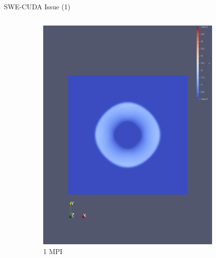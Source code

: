 \documentclass[
  english,            %
  aspectratio=169,    %
  11pt
]{tumbeamer}
\begin{document}
\begin{frame}{SWE-CUDA Issue (1)}
\begin{columns}
\begin{column}{0.45\textwidth}
	\begin{figure}[htpb]
		\centering
		\begin{subfigure}{.49\textwidth}
			\includegraphics[width=\textwidth,keepaspectratio=true]{figs/1_validation_cuda_original_1mpi.png}
			\caption{1 MPI}
			\label{fig:1mpi}
		\end{subfigure}
		\begin{subfigure}{.49\textwidth}
			\centering

\end{subfigure}
\end{figure}
\end{column}
\end{columns}
\end{frame}
\end{document}
